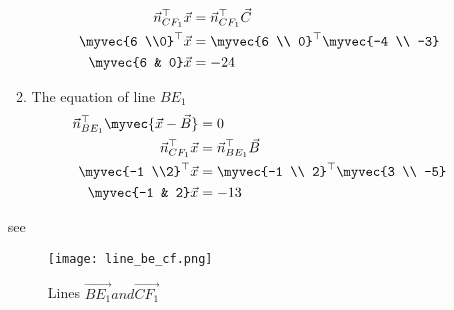 \documentclass[11pt]{book}
\begin{document}
\begin{enumerate}[label=\thesection.\arabic*.,ref=\thesection.\theenumi]
\begin{enumerate}
\begin{align}
          \vec{n}^{\top}_{CF_1}\vec{x}&= \vec{n}^{\top}_{CF_1}\vec{C} \\
          \myvec{6 \\0}^{\top}\vec{x}&=\myvec{6 \\ 0}^{\top}\myvec{-4 \\ -3}\\
          \myvec{6 & 0}\vec{x}&=-24
      \end{align}
      \item The equation of line $BE_1$
      \begin{align}
          \vec{n}^{\top}_{BE_1}\myvec{\vec{x}-\vec{B}}&=0 \\
          \vec{n}^{\top}_{CF_1}\vec{x}&= \vec{n}^{\top}_{BE_1}\vec{B} \\
          \myvec{-1 \\2}^{\top}\vec{x}&=\myvec{-1 \\ 2}^{\top}\myvec{3 \\ -5}\\
          \myvec{-1 & 2}\vec{x}&=-13
      \end{align}
  \end{enumerate}
  see 
  \begin{figure}[H]
      \centering
      \texttt{[image: line\_be\_cf.png]}
      \caption{Lines $\vec{BE_1} and \vec{CF_1}$}
      \label{fig:line_BE1_CF1}
  \end{figure}
  


\end{enumerate}
\end{document}
